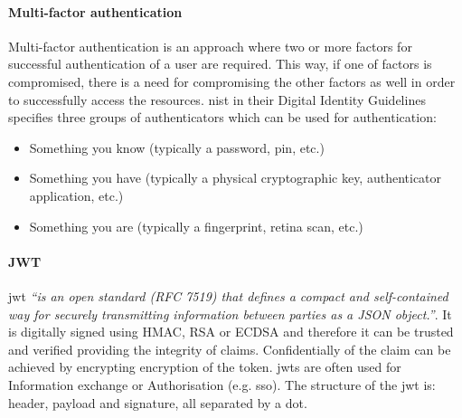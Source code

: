 \paragraph{Multi-factor authentication}
Multi-factor authentication is an approach where two or more factors for successful authentication of a user are required. This way, if one of factors is compromised, there is a need for compromising the other factors as well in order to successfully access the resources. \acrshort{nist} in their Digital Identity Guidelines~\cite{Grassi2017Digital3} specifies three groups of authenticators which can be used for authentication:
\begin{itemize}[noitemsep]
    \item Something you know (typically a password, \acrshort{pin}, etc.)
    \item Something you have (typically a physical cryptographic key, authenticator application, etc.)
    \item Something you are (typically a fingerprint, retina scan, etc.)
\end{itemize}

\paragraph{JWT}
\acrfull{jwt} \textit{``is an open standard (RFC 7519) that defines a compact and self-contained way for securely transmitting information between parties as a JSON object.''}\cite{JWT.ioJSONToken}. It is digitally signed using HMAC, RSA or ECDSA and therefore it can be trusted and verified providing the integrity of claims. Confidentially of the claim can be achieved by encrypting encryption of the token. \acrshort{jwt}s are often used for Information exchange or Authorisation (e.g. \acrshort{sso}). The structure of the \acrshort{jwt} is: header, payload and signature, all separated by a dot.~\cite{InternetEngineeringTaskForceIETF2015JSONRFC7519}